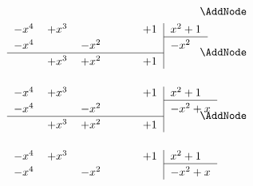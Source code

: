 \begin{NodesList}
\begin{align*}
\begin{minipage}[t]{0.5\textwidth}
\begin{tabular}{lllll|l}
\\
\end{tabular}
\end{minipage}&\AddNode\\
\begin{minipage}[t]{0.5\textwidth}
\begin{tabular}{lllll|l}
$-x^4$& $+x^3$ & \phantom{$-x^2$} & \phantom{$-x$} &$+1$&$ x^2+1$\\ 
\cline{6-6}
  \vrule height 2.5ex width 0pt $-x^4$& &$-x^2$  &  &&$-x^2$\\ 
\cline{1-5}
  \vrule height 2.5ex width 0pt &$+x^3$ & $+x^2$ &  &$+1$&  \\ 
\\
\end{tabular}
\end{minipage}&\AddNode\\
\begin{minipage}[t]{0.5\textwidth}
\begin{tabular}{lllll|l}
$-x^4$& $+x^3$ & \phantom{$-x^2$} & \phantom{$-x$} &$+1$&$ x^2+1$\\ 
\cline{6-6}
  \vrule height 2.5ex width 0pt $-x^4$& &$-x^2$  &  &&$-x^2+x$\\ 
\cline{1-5}
  \vrule height 2.5ex width 0pt &$+x^3$ & $+x^2$ &  &$+1$&  \\ 
\\
\end{tabular}
\end{minipage}&\AddNode\\
\begin{minipage}[t]{0.5\textwidth}
\begin{tabular}{lllll|l}
$-x^4$& $+x^3$ & \phantom{$-x^2$} & \phantom{$-x$} &$+1$&$ x^2+1$\\ 
\cline{6-6}
  \vrule height 2.5ex width 0pt $-x^4$& &$-x^2$  &  &&$-x^2+x$\\ 

\end{tabular}
\end{minipage}
\end{align*}
\end{NodesList}
